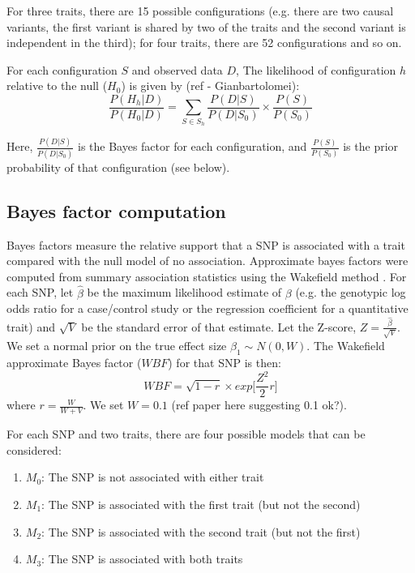 \documentclass{article}
\begin{document}
\noindent For three traits, there are 15 possible configurations (e.g. there are two causal variants, the first variant is shared by two of the traits and the second variant is independent in the third); for four traits, there are 52 configurations and so on.

For each configuration $S$ and observed data $D$, The likelihood of configuration $h$ relative to the null ($H_0$) is given by (ref - Gianbartolomei):
\begin{equation}
\label{rbf_equation}
\frac{P(H_h|D)}{P(H_0|D)} = \sum_{S \in S_h} \frac{P(D|S)}{P(D|S_0)} \times \frac{P(S)}{P(S_0)}
\end{equation}

\noindent Here, $\frac{P(D|S)}{P(D|S_0)}$ is the Bayes factor for each configuration, and $\frac{P(S)}{P(S_0)}$ is the prior probability of that configuration (see below).

\subsection{Bayes factor computation}
\label{bf_comp}
Bayes factors measure the relative support that a SNP is associated with a trait compared with the null model of no association. Approximate bayes factors were computed from summary association statistics using the Wakefield method \citep{Wakefield:2009aa}. For each SNP, let $\hat{\beta}$ be the maximum likelihood estimate of $\beta$ (e.g. the genotypic log odds ratio for a case/control study or the regression coefficient for a quantitative trait) and $\sqrt{V}$ be the standard error of that estimate. Let the Z-score, $Z = \frac{\hat{\beta}}{\sqrt{V}}$. We set a normal prior on the true effect size $\beta_1 \sim N(0,W)$. The Wakefield approximate Bayes factor ($WBF$) for that SNP is then:
\begin{equation}
WBF = \sqrt{1-r} \times exp \Big[\frac{Z^2}{2} r \Big]
\end{equation}
where $r = \frac{W}{W+V}$. We set $W = 0.1$ (ref paper here suggesting 0.1 ok?).

For each SNP and two traits, there are four possible models that can be considered:
\begin{enumerate}[start=0]
  \item $M_0$: The SNP is not associated with either trait
  \item $M_1$: The SNP is associated with the first trait (but not the second)
  \item $M_2$: The SNP is associated with the second trait (but not the first)
  \item $M_3$: The SNP is associated with both traits
\end{enumerate}
\end{document}
